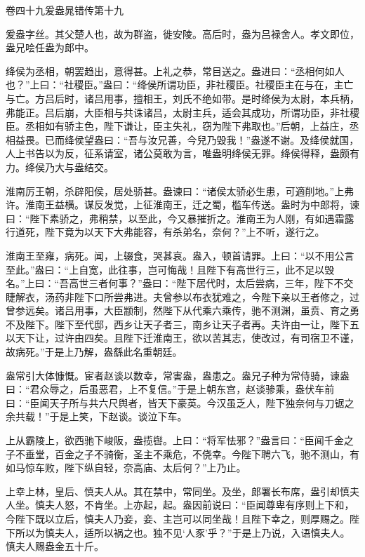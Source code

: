 \documentclass[12pt,UTF8]{ctexbook}
\begin{document}
卷四十九爰盎晁错传第十九



爰盎字丝。其父楚人也，故为群盗，徙安陵。高后时，盎为吕禄舍人。孝文即位，盎兄哙任盎为郎中。



绛侯为丞相，朝罢趋出，意得甚。上礼之恭，常目送之。盎进曰：“丞相何如人也？”上曰：“社稷臣。”盎曰：“绛侯所谓功臣，非社稷臣。社稷臣主在与在，主亡与亡。方吕后时，诸吕用事，擅相王，刘氏不绝如带。是时绛侯为太尉，本兵柄，弗能正。吕后崩，大臣相与共诛诸吕，太尉主兵，适会其成功，所谓功臣，非社稷臣。丞相如有骄主色，陛下谦让，臣主失礼，窃为陛下弗取也。”后朝，上益庄，丞相益畏。已而绛侯望盎曰：“吾与汝兄善，今兒乃毁我！”盎遂不谢。及绛侯就国，人上书告以为反，征系请室，诸公莫敢为言，唯盎明绛侯无罪。绛侯得释，盎颇有力。绛侯乃大与盎结交。



淮南厉王朝，杀辟阳侯，居处骄甚。盎谏曰：“诸侯太骄必生患，可適削地。”上弗许。淮南王益横。谋反发觉，上征淮南王，迁之蜀，槛车传送。盎时为中郎将，谏曰：“陛下素骄之，弗稍禁，以至此，今又暴摧折之。淮南王为人刚，有如遇霜露行道死，陛下竟为以天下大弗能容，有杀弟名，奈何？”上不听，遂行之。



淮南王至雍，病死。闻，上辍食，哭甚哀。盎入，顿首请罪。上曰：“以不用公言至此。”盎曰：“上自宽，此往事，岂可悔哉！且陛下有高世行三，此不足以毁名。”上曰：“吾高世三者何事？”盎曰：“陛下居代时，太后尝病，三年，陛下不交睫解衣，汤药非陛下口所尝弗进。夫曾参以布衣犹难之，今陛下亲以王者修之，过曾参远矣。诸吕用事，大臣颛制，然陛下从代乘六乘传，驰不测渊，虽贲、育之勇不及陛下。陛下至代邸，西乡让天子者三，南乡让天子者再。夫许由一让，陛下五以天下让，过许由四矣。且陛下迁淮南王，欲以苦其志，使改过，有司宿卫不谨，故病死。”于是上乃解，盎繇此名重朝廷。



盎常引大体慷慨。宦者赵谈以数幸，常害盎，盎患之。盎兄子种为常侍骑，谏盎曰：“君众辱之，后虽恶君，上不复信。”于是上朝东宫，赵谈骖乘，盎伏车前曰：“臣闻天子所与共六尺舆者，皆天下豪英。今汉虽乏人，陛下独奈何与刀锯之余共载！”于是上笑，下赵谈。谈泣下车。



上从霸陵上，欲西驰下峻阪，盎揽辔。上曰：“将军怯邪？”盎言曰：“臣闻千金之子不垂堂，百金之子不骑衡，圣主不乘危，不侥幸。今陛下聘六飞，驰不测山，有如马惊车败，陛下纵自轻，奈高庙、太后何？”上乃止。



上幸上林，皇后、慎夫人从。其在禁中，常同坐。及坐，郎署长布席，盎引却慎夫人坐。慎夫人怒，不肯坐。上亦起，起。盎因前说曰：“臣闻尊卑有序则上下和，今陛下既以立后，慎夫人乃妾，妾、主岂可以同坐哉！且陛下幸之，则厚赐之。陛下所以为慎夫人，适所以祸之也。独不见‘人豕’乎？”于是上乃说，入语慎夫人。慎夫人赐盎金五十斤。
\end{document}
